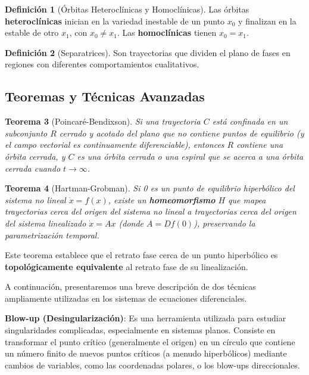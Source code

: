 \documentclass[12pt,letterpaper,oneside]{book}
\newtheorem{teorema}{Teorema}[chapter]
\theoremstyle{definition}
\newtheorem{definicion}[teorema]{Definición}
\theoremstyle{remark}
\begin{document}
	\begin{definicion}[Órbitas Heteroclínicas y Homoclínicas]
		Las órbitas \textbf{heteroclínicas} inician en la variedad inestable de un punto $x_0$ y finalizan en la estable de otro $x_1$, con $x_0 \neq x_1$. Las \textbf{homoclínicas} tienen $x_0 = x_1$.
	\end{definicion}
	
	\begin{definicion}[Separatrices]
		Son trayectorias que dividen el plano de fases en regiones con diferentes comportamientos cualitativos.
	\end{definicion}
	
	\subsection{Teoremas y Técnicas Avanzadas}
	
	\begin{teorema}[Poincaré-Bendixson]
		Si una trayectoria $C$ está confinada en un subconjunto $R$ cerrado y acotado del plano que no contiene puntos de equilibrio (y el campo vectorial es continuamente diferenciable), entonces $R$ contiene una órbita cerrada, y $C$ es una órbita cerrada o una espiral que se acerca a una órbita cerrada cuando $t \to \infty$.
	\end{teorema}
	
	\begin{teorema}[Hartman-Grobman]
		Si 0 es un punto de equilibrio hiperbólico del sistema no lineal $\dot{x} = f(x)$, existe un \textbf{homeomorfismo} $H$ que mapea trayectorias cerca del origen del sistema no lineal a trayectorias cerca del origen del sistema linealizado $\dot{x} = Ax$ (donde $A = Df(0)$), preservando la parametrización temporal.
	\end{teorema}
	
	Este teorema establece que el retrato fase cerca de un punto hiperbólico es \textbf{topológicamente equivalente} al retrato fase de su linealización.
	
	A continuación, presentaremos una breve descripción de dos técnicas ampliamente utilizadas en los sistemas de ecuaciones diferenciales.
	
	\textbf{Blow-up (Desingularización)}:
		Es una herramienta utilizada para estudiar singularidades complicadas, especialmente en sistemas planos. Consiste en transformar el punto crítico (generalmente el origen) en un círculo que contiene un número finito de nuevos puntos críticos (a menudo hiperbólicos) mediante cambios de variables, como las coordenadas polares, o los blow-ups direccionales.
\end{document}
